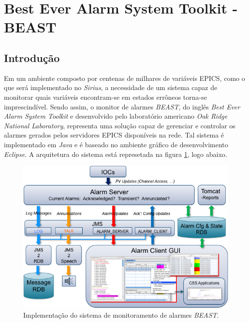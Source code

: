 \section {Best Ever Alarm System Toolkit - BEAST}

\subsection {Introdução} \label{beast-intro}

Em um ambiente composto por centenas de milhares de variáveis EPICS, como o que
será implementado no \textit{Sirius}, a necessidade de um sistema capaz de
monitorar quais variáveis encontram-se em estados errôneos torna-se
imprescindível. Sendo assim, o monitor de alarmes \textit{BEAST}, do inglês
\textit{Best Ever Alarm System Toolkit} e desenvolvido pelo laboratório
americano \textit{Oak Ridge National Laboratory}, representa uma solução capaz
de gerenciar e controlar os alarmes gerados pelos servidores EPICS disponíveis
na rede. Tal sistema é implementado em \textit{Java} e é baseado no ambiente
gráfico de desenvolvimento \textit{Eclipse}. A arquitetura do sistema
está represetada na figura \ref{fig:best_arquitetura}, logo abaixo.

\FloatBarrier

\begin{figure}[h]

\centering
\includegraphics[scale=0.55]{image/beast-arquitetura}
\caption {Implementação do sistema de monitoramento de alarmes
\textit{BEAST}.}
\label{fig:best_arquitetura}
\end{figure}

\FloatBarrier

